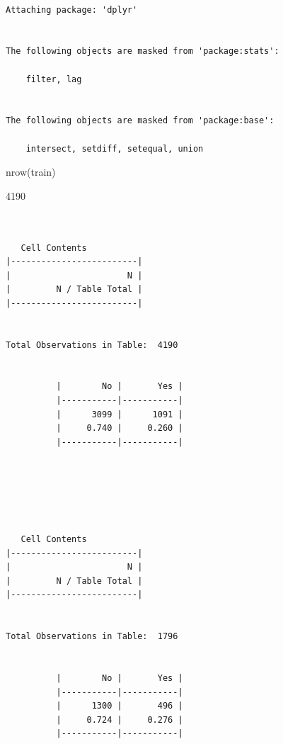 \documentclass[
  letterpaper,
  DIV=11,
  numbers=noendperiod]{scrreprt}
\newenvironment{Shaded}{\begin{snugshade}}{\end{snugshade}}
\newcommand{\CommentTok}[1]{\textcolor[rgb]{0.37,0.37,0.37}{#1}}
\newcommand{\FunctionTok}[1]{\textcolor[rgb]{0.28,0.35,0.67}{#1}}
\newcommand{\NormalTok}[1]{\textcolor[rgb]{0.00,0.23,0.31}{#1}}
\newcommand{\SpecialCharTok}[1]{\textcolor[rgb]{0.37,0.37,0.37}{#1}}
\begin{document}
\begin{verbatim}

Attaching package: 'dplyr'


The following objects are masked from 'package:stats':

    filter, lag


The following objects are masked from 'package:base':

    intersect, setdiff, setequal, union

\end{verbatim}

\begin{Shaded}
\begin{Highlighting}[]
\FunctionTok{nrow}\NormalTok{(train)}
\end{Highlighting}
\end{Shaded}

4190

\begin{Shaded}
\end{Shaded}

\begin{verbatim}

 
   Cell Contents
|-------------------------|
|                       N |
|         N / Table Total |
|-------------------------|

 
Total Observations in Table:  4190 

 
          |        No |       Yes | 
          |-----------|-----------|
          |      3099 |      1091 | 
          |     0.740 |     0.260 | 
          |-----------|-----------|



 

 
   Cell Contents
|-------------------------|
|                       N |
|         N / Table Total |
|-------------------------|

 
Total Observations in Table:  1796 

 
          |        No |       Yes | 
          |-----------|-----------|
          |      1300 |       496 | 
          |     0.724 |     0.276 | 
          |-----------|-----------|



 
\end{verbatim}
\end{document}
